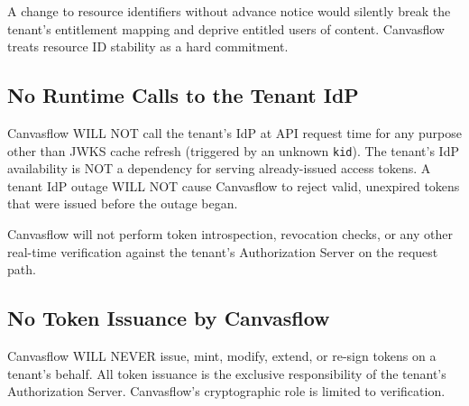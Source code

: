 A change to resource identifiers without advance notice would silently break the tenant's
entitlement mapping and deprive entitled users of content. Canvasflow treats resource
ID stability as a hard commitment.

\subsection{No Runtime Calls to the Tenant IdP}

Canvasflow WILL NOT call the tenant's IdP at API request time for any purpose other than
JWKS cache refresh (triggered by an unknown \texttt{kid}). The tenant's IdP availability
is NOT a dependency for serving already-issued access tokens. A tenant IdP outage WILL
NOT cause Canvasflow to reject valid, unexpired tokens that were issued before the outage
began.

Canvasflow will not perform token introspection, revocation checks, or any other
real-time verification against the tenant's Authorization Server on the request path.

\subsection{No Token Issuance by Canvasflow}

Canvasflow WILL NEVER issue, mint, modify, extend, or re-sign tokens on a tenant's
behalf. All token issuance is the exclusive responsibility of the tenant's Authorization
Server. Canvasflow's cryptographic role is limited to verification.
